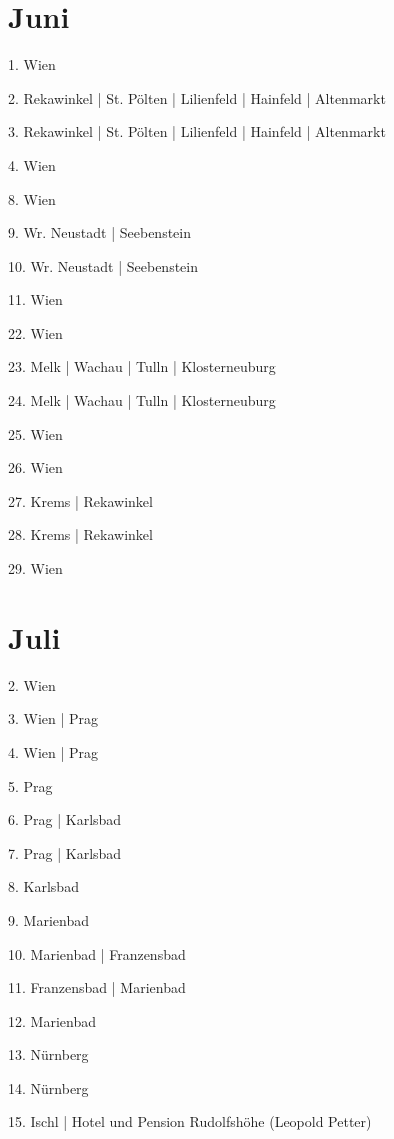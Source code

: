 \documentclass[twoside=false,titlepage=false,open=any, parskip=never, fontsize=10pt, headings=small, chapterprefix=false, appendixprefix=false, DIV=15]{scrbook}
\begin{document}
\begin{multicols}{3}
            \section*{Juni}
            1. Wien\par
            2. Rekawinkel | St. Pölten | Lilienfeld | Hainfeld | Altenmarkt\par
            3. Rekawinkel | St. Pölten | Lilienfeld | Hainfeld | Altenmarkt\par
            4. Wien\par
            8. Wien\par
            9. Wr. Neustadt | Seebenstein\par
            10. Wr. Neustadt | Seebenstein\par
            11. Wien\par
            22. Wien\par
            23. Melk | Wachau | Tulln | Klosterneuburg\par
            24. Melk | Wachau | Tulln | Klosterneuburg\par
            25. Wien\par
            26. Wien\par
            27. Krems | Rekawinkel\par
            28. Krems | Rekawinkel\par
            29. Wien\par
            \section*{Juli}
            2. Wien\par
            3. Wien | Prag\par
            4. Wien | Prag\par
            5. Prag\par
            6. Prag | Karlsbad\par
            7. Prag | Karlsbad\par
            8. Karlsbad\par
            9. Marienbad\par
            10. Marienbad | Franzensbad\par
            11. Franzensbad | Marienbad\par
            12. Marienbad\par
            13. Nürnberg\par
            14. Nürnberg\par
            15. Ischl | Hotel und Pension Rudolfshöhe (Leopold Petter)\par

\end{multicols}
\end{document}
